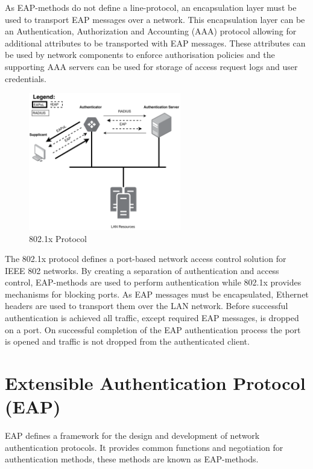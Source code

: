 As EAP-methods do not define a line-protocol, an encapsulation layer must be used to transport EAP messages over a network. This encapsulation layer can be an Authentication, Authorization and Accounting (AAA)\cite{aruba_aaa} protocol allowing for additional attributes to be transported with EAP messages. These attributes can be used by network components to enforce authorisation policies and the supporting AAA servers can be used for storage of access request logs and user credentials.

\begin{figure}\begin{center}
    \includegraphics[height=6cm]{images/dot1x_wired_protocol.png}
    \caption{802.1x Protocol}
    \label{fig:802_wired_protocol}
\end{center}\end{figure}

The 802.1x protocol defines a port-based network access control solution for IEEE 802 networks. By creating a separation of authentication and access control, EAP-methods are used to perform authentication while 802.1x provides mechanisms for blocking ports. As EAP messages must be encapsulated, Ethernet headers are used to transport them over the LAN network. Before successful authentication is achieved all traffic, except required EAP messages, is dropped on a port. On successful completion of the EAP authentication process the port is opened and traffic is not dropped from the authenticated client.

\section{Extensible Authentication Protocol (EAP)}
EAP defines a framework for the design and development of network authentication protocols. It provides common functions and negotiation for authentication methods, these methods are known as EAP-methods. 

